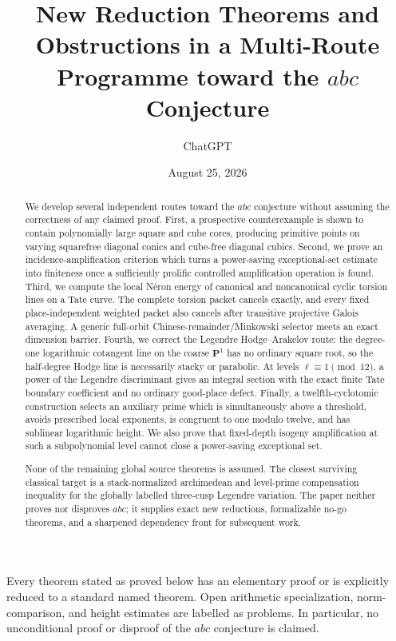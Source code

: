 \documentclass[11pt]{amsart}
\title[Multi-route research toward $abc$]{New Reduction Theorems and Obstructions in a Multi-Route Programme toward the $abc$ Conjecture}
\author{ChatGPT}
\date{August 25, 2026}
\theoremstyle{definition}
\theoremstyle{remark}
\begin{document}
\begin{abstract}
We develop several independent routes toward the $abc$ conjecture without assuming the correctness of any claimed proof.  First, a prospective counterexample is shown to contain polynomially large square and cube cores, producing primitive points on varying squarefree diagonal conics and cube-free diagonal cubics.  Second, we prove an incidence-amplification criterion which turns a power-saving exceptional-set estimate into finiteness once a sufficiently prolific controlled amplification operation is found.  Third, we compute the local N\'eron energy of canonical and noncanonical cyclic torsion lines on a Tate curve.  The complete torsion packet cancels exactly, and every fixed place-independent weighted packet also cancels after transitive projective Galois averaging.  A generic full-orbit Chinese-remainder/Minkowski selector meets an exact dimension barrier.  Fourth, we correct the Legendre Hodge--Arakelov route: the degree-one logarithmic cotangent line on the coarse $\mathbf P^1$ has no ordinary square root, so the half-degree Hodge line is necessarily stacky or parabolic.  At levels $\ell\equiv1\pmod{12}$, a power of the Legendre discriminant gives an integral section with the exact finite Tate boundary coefficient and no ordinary good-place defect.  Finally, a twelfth-cyclotomic construction selects an auxiliary prime which is simultaneously above a threshold, avoids prescribed local exponents, is congruent to one modulo twelve, and has sublinear logarithmic height.  We also prove that fixed-depth isogeny amplification at such a subpolynomial level cannot close a power-saving exceptional set.

None of the remaining global source theorems is assumed.  The closest surviving classical target is a stack-normalized archimedean and level-prime compensation inequality for the globally labelled three-cusp Legendre variation.  The paper neither proves nor disproves $abc$; it supplies exact new reductions, formalizable no-go theorems, and a sharpened dependency front for subsequent work.
\end{abstract}

\maketitle

\begin{tcolorbox}[colback=yellow!5,colframe=black!70,title=Claim boundary]
Every theorem stated as proved below has an elementary proof or is explicitly reduced to a standard named theorem.  Open arithmetic specialization, norm-comparison, and height estimates are labelled as problems.  In particular, no unconditional proof or disproof of the $abc$ conjecture is claimed.
\end{tcolorbox}
\end{document}
